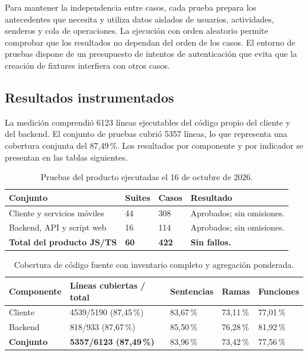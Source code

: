 Para mantener la independencia entre casos, cada prueba prepara los antecedentes que necesita y utiliza datos aislados de usuarios, actividades, senderos y cola de operaciones. La ejecución con orden aleatorio permite comprobar que los resultados no dependan del orden de los casos. El entorno de pruebas dispone de un presupuesto de intentos de autenticación que evita que la creación de fixtures interfiera con otros casos.

\subsection{Resultados instrumentados}

La medición comprendió 6123 líneas ejecutables del código propio del cliente y del backend. El conjunto de pruebas cubrió 5357 líneas, lo que representa una cobertura conjunta del 87{,}49\,\%. Los resultados por componente y por indicador se presentan en las tablas siguientes.

\begin{table}[H]
\centering
\small
\setlength{\tabcolsep}{4pt}
\renewcommand{\arraystretch}{1.15}
\begin{tabular}{|p{4.6cm}|p{2cm}|p{2cm}|p{4cm}|}
\hline
\textbf{Conjunto} & \textbf{Suites} & \textbf{Casos} & \textbf{Resultado} \\
\hline
Cliente y servicios móviles & 44 & 308 & Aprobados; sin omisiones. \\
\hline
Backend, API y script web & 16 & 114 & Aprobados; sin omisiones. \\
\hline
\textbf{Total del producto JS/TS} & \textbf{60} & \textbf{422} & \textbf{Sin fallos.} \\
\hline
\end{tabular}
\caption{Pruebas del producto ejecutadas el 16 de octubre de 2026.}
\label{tab:resultados-pruebas}
\end{table}

\begin{table}[H]
\centering
\small
\setlength{\tabcolsep}{4pt}
\renewcommand{\arraystretch}{1.15}
\begin{tabular}{|p{2.7cm}|p{3.1cm}|p{2cm}|p{2cm}|p{2cm}|}
\hline
\textbf{Componente} & \textbf{Líneas cubiertas / total} & \textbf{Sentencias} & \textbf{Ramas} & \textbf{Funciones} \\
\hline
Cliente & 4539/5190 (87{,}45\,\%) & 83{,}67\,\% & 73{,}11\,\% & 77{,}01\,\% \\
\hline
Backend & 818/933 (87{,}67\,\%) & 85{,}50\,\% & 76{,}28\,\% & 81{,}92\,\% \\
\hline
\textbf{Conjunto} & \textbf{5357/6123 (87{,}49\,\%)} & 83{,}96\,\% & 73{,}42\,\% & 77{,}56\,\% \\
\hline
\end{tabular}
\caption{Cobertura de código fuente con inventario completo y agregación ponderada.}
\label{tab:cobertura-instrumentada}
\end{table}

